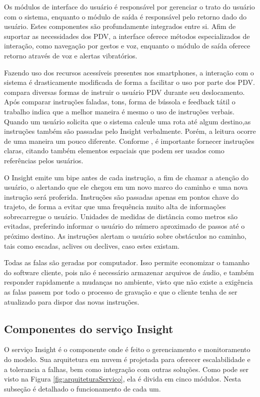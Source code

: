\documentclass[twoside,english,brazilian]{UNISINOSartigo}
\begin{document}
Os módulos de interface do usuário é responsável por gerenciar o trato do usuário com o sistema, enquanto o módulo de saída é responsável pelo retorno dado do usuário. Estes componentes são profundamente integrados entre si. Afim de suportar as necessidades dos PDV, a interface oferece métodos especializados de interação, como navegação por gestos e voz, enquanto o módulo de saída oferece retorno através de voz e alertas vibratórios.

Fazendo uso dos recursos acessíveis presentes nos smartphones, a interação com o sistema é drasticamente modificada de forma a facilitar o uso por parte dos PDV.  compara diversas formas de instruir o usuário PDV durante seu deslocamento. Após comparar instruções faladas, tons, forma de bússola e feedback tátil o trabalho indica que a melhor maneira é mesmo o uso de instruções verbais. Quando um usuário solicita que o sistema calcule uma rota até algum destino,as instruções também são passadas pelo Insight verbalmente. Porém, a leitura ocorre de uma maneira um pouco diferente. Conforme , é importante fornecer instruções claras, citando também elementos espaciais que podem ser usados como referências pelos usuários.

O Insight emite um bipe antes de cada instrução, a fim de chamar a atenção do usuário, o alertando que ele chegou em um novo marco do caminho e uma nova instrução será proferida. Instruções são passadas apenas em pontos chave do trajeto, de forma a evitar que uma frequência muito alta de informações sobrecarregue o usuário. Unidades de medidas de distância como metros são evitadas, preferindo informar o usuário do número aproximado de passos até o próximo destino. As instruções alertam o usuário sobre obstáculos no caminho, tais como escadas, aclives ou declives, caso estes existam.

Todas as falas são geradas por computador. Isso permite economizar o tamanho do software cliente, pois não é necessário armazenar arquivos de áudio, e também responder rapidamente a mudanças no ambiente, visto que não existe a exigência as falas passem por todo o processo de gravação e que o cliente tenha de ser atualizado para dispor das novas instruções.

\subsection{Componentes do serviço Insight}
O serviço Insight é o componente onde é feito o gerenciamento e monitoramento do modelo. Sua arquitetura em nuvem é projetada para oferecer escalabilidade e a tolerancia a falhas, bem como integração com outras soluções. Como pode ser visto na Figura \ref{fig:arquiteturaServico}, ela é divida em cinco módulos. Nesta subseção é detalhado o funcionamento de cada um.
\end{document}
